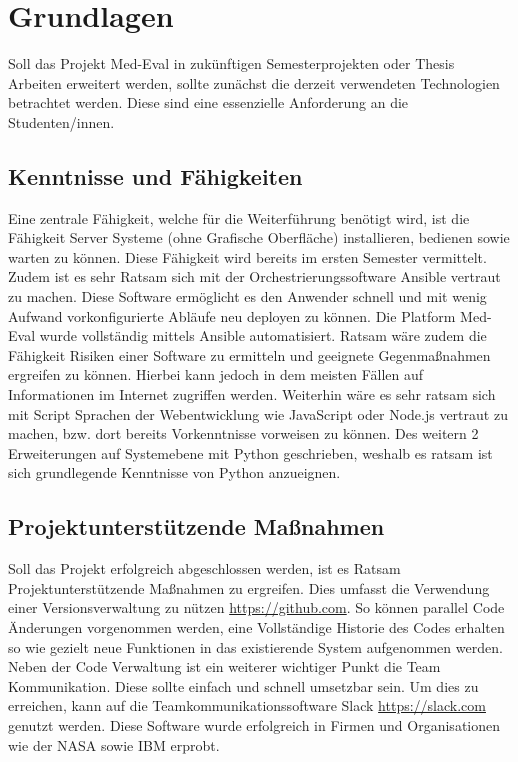\chapter{Grundlagen}
Soll das Projekt Med-Eval in zukünftigen Semesterprojekten oder Thesis Arbeiten erweitert werden, sollte zunächst die derzeit verwendeten Technologien betrachtet werden. Diese sind eine essenzielle Anforderung an die Studenten/innen.

\section{Kenntnisse und Fähigkeiten}
Eine zentrale Fähigkeit, welche für die Weiterführung benötigt wird, ist die Fähigkeit Server Systeme (ohne Grafische Oberfläche) installieren, bedienen sowie warten zu können. Diese Fähigkeit wird bereits im ersten Semester vermittelt. Zudem ist es sehr Ratsam sich mit der Orchestrierungssoftware Ansible vertraut zu machen. Diese Software ermöglicht es den Anwender schnell und mit wenig Aufwand vorkonfigurierte Abläufe neu deployen zu können. Die Platform Med-Eval wurde vollständig mittels Ansible automatisiert. 
Ratsam wäre zudem die Fähigkeit Risiken einer Software zu ermitteln und geeignete Gegenmaßnahmen ergreifen zu können. Hierbei kann jedoch in dem meisten Fällen auf Informationen im Internet zugriffen werden.
Weiterhin wäre es sehr ratsam sich mit Script Sprachen der Webentwicklung wie JavaScript oder Node.js vertraut zu machen, bzw. dort bereits Vorkenntnisse vorweisen zu können. Des weitern 2 Erweiterungen auf Systemebene mit Python geschrieben, weshalb es ratsam ist sich grundlegende Kenntnisse von Python anzueignen.

\section{Projektunterstützende Maßnahmen}
Soll das Projekt erfolgreich abgeschlossen werden, ist es Ratsam Projektunterstützende Maßnahmen zu ergreifen. Dies umfasst die Verwendung einer Versionsverwaltung zu nützen \url{https://github.com}. So können parallel Code Änderungen vorgenommen werden, eine Vollständige Historie des Codes erhalten so wie gezielt neue Funktionen in das existierende System aufgenommen werden.
Neben der Code Verwaltung ist ein weiterer wichtiger Punkt die Team Kommunikation. Diese sollte einfach und schnell umsetzbar sein. Um dies zu erreichen, kann auf die Teamkommunikationssoftware Slack \url{https://slack.com} genutzt werden. Diese Software wurde erfolgreich in Firmen und Organisationen wie der NASA sowie IBM erprobt.
\\
